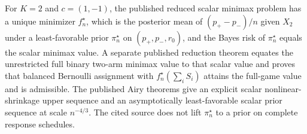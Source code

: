 For \(K=2\) and \(c=(1,-1)\), the published reduced scalar minimax problem has a unique minimizer \(f_n^\star\), which is the posterior mean of \((p_+-p_-)/n\) given \(X_2\) under a least-favorable prior \(\pi_n^\star\) on \((p_+,p_-,r_0)\), and the Bayes risk of \(\pi_n^\star\) equals the scalar minimax value. A separate published reduction theorem equates the unrestricted full binary two-arm minimax value to that scalar value and proves that balanced Bernoulli assignment with \(f_n^\star(\sum_i S_i)\) attains the full-game value and is admissible. The published Airy theorems give an explicit scalar nonlinear-shrinkage upper sequence and an asymptotically least-favorable scalar prior sequence at scale \(n^{-4/3}\). The cited source does not lift \(\pi_n^\star\) to a prior on complete response schedules.